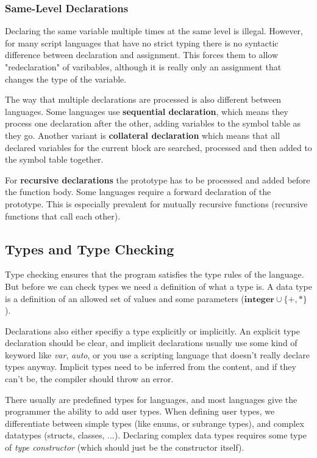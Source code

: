 \documentclass{article}
\begin{document}
\subsubsection{Same-Level Declarations}
Declaring the same variable multiple times at the same level is illegal.
However, for many script languages that have no strict typing there is no syntactic difference between declaration and assignment.
This forces them to allow "redeclaration" of varibables, although it is really only an assignment that changes the type of the variable.

The way that multiple declarations are processed is also different between languages.
Some languages use \textbf{sequential declaration}, which means they process one declaration after the other, adding variables to the symbol table as they go.
Another variant is \textbf{collateral declaration} which means that all declared variables for the current block are searched, processed and then added to the symbol table together.

For \textbf{recursive declarations} the prototype has to be processed and added before the function body.
Some languages require a forward declaration of the prototype.
This is especially prevalent for mutually recursive functions (recursive functions that call each other).

\subsection{Types and Type Checking}
Type checking ensures that the program satisfies the type rules of the language.
But before we can check types we need a definition of what a type is.
A data type is a definition of an allowed set of values and some parameters ($\textbf{integer} \cup \{+,*\}$).

Declarations also either specifiy a type explicitly or implicitly.
An explicit type declaration should be clear, and implicit declarations usually use some kind of keyword like \emph{var}, \emph{auto}, or you use a scripting language that doesn't really declare types anyway.
Implicit types need to be inferred from the content, and if they can't be, the compiler should throw an error.

There usually are predefined types for languages, and most languages give the programmer the ability to add user types.
When defining user types, we differentiate between simple types (like enums, or subrange types), and complex datatypes (structs, classes, ...).
Declaring complex data types requires some type of \emph{type constructor} (which should just be the constructor itself). %
\end{document}

